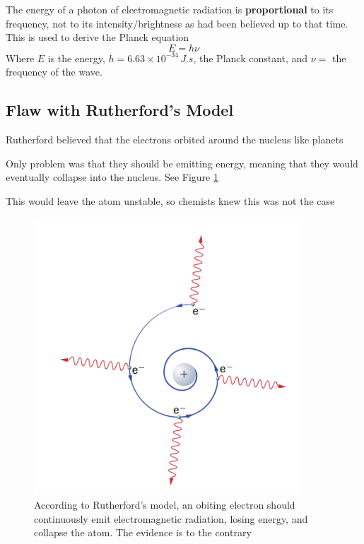 The energy of a photon of electromagnetic radiation is \textbf{proportional} to its frequency,
not to its intensity/brightness as had been believed up to that time. This is used to derive
the Planck equation
\[
    E=h\nu
\]
Where $E$ is the energy, $h=6.63\times10^{-34}\,\si{J.s}$, the Planck constant, and $\nu=$ the
frequency of the wave.\\

\subsection{Flaw with Rutherford's Model}
\begin{bulleted-list}
    \item Rutherford believed that the electrons orbited around the nucleus like planets
    \item Only problem was that they should be emitting energy, meaning that they would eventually
        collapse into the nucleus. See Figure \ref{fig:rutherford-model-flaw}
    \item This would leave the atom unstable, so chemists knew this was not the case
\end{bulleted-list}

\begin{figure}[ht!]
    \centering
    \includegraphics[width=0.4 \textwidth]{../figures/rutherford-model-flaw.png}
    \caption{According to Rutherford's model, an obiting electron should continuously emit
            electromagnetic radiation, losing energy, and collapse the atom. The evidence is to the
            contrary}
    \label{fig:rutherford-model-flaw}
\end{figure}

